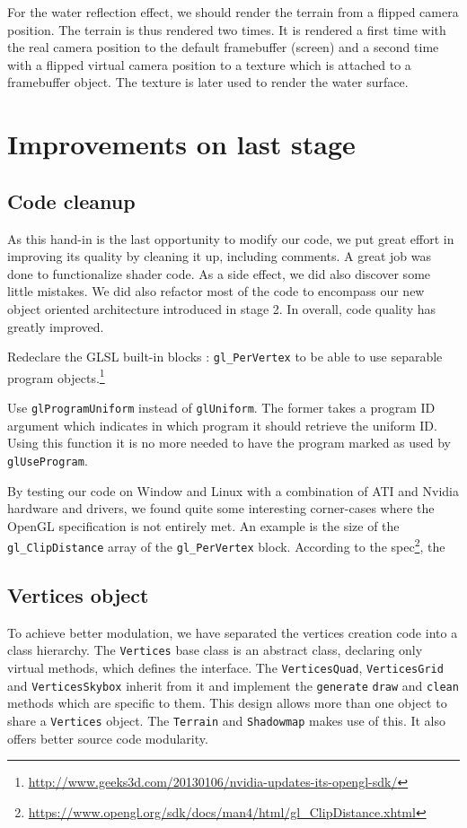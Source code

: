 \documentclass[a4paper,11pt]{article}
\begin{document}
For the water reflection effect, we should render the terrain from a flipped camera position. The terrain is thus rendered two times. It is rendered a first time with the real camera position to the default framebuffer (screen) and a second time with a flipped virtual camera position to a texture which is attached to a framebuffer object. The texture is later used to render the water surface.

\section{Improvements on last stage}

\subsection{Code cleanup}

As this hand-in is the last opportunity to modify our code, we put great effort in improving its quality by cleaning it up, including comments. A great job was done to functionalize shader code. As a side effect, we did also discover some little mistakes. We did also refactor most of the code to encompass our new object oriented architecture introduced in stage 2. In overall, code quality has greatly improved.

Redeclare the GLSL built-in blocks : \texttt{gl\_PerVertex} to be able to use separable program objects.\footnote{\url{http://www.geeks3d.com/20130106/nvidia-updates-its-opengl-sdk/}}

Use \texttt{glProgramUniform} instead of \texttt{glUniform}. The former takes a program ID argument which indicates in which program it should retrieve the uniform ID. Using this function it is no more needed to have the program marked as used by \texttt{glUseProgram}.

By testing our code on Window and Linux with a combination of ATI and Nvidia hardware and drivers, we found quite some interesting corner-cases where the OpenGL specification is not entirely met. An example is the size of the \texttt{gl\_ClipDistance} array of the \texttt{gl\_PerVertex} block. According to the spec\footnote{\url{https://www.opengl.org/sdk/docs/man4/html/gl\_ClipDistance.xhtml}}, the

\subsection{Vertices object}

To achieve better modulation, we have separated the vertices creation code into a class hierarchy. The \texttt{Vertices} base class is an abstract class, declaring only virtual methods, which defines the interface. The \texttt{VerticesQuad}, \texttt{VerticesGrid} and \texttt{VerticesSkybox} inherit from it and implement the \texttt{generate} \texttt{draw} and \texttt{clean} methods which are specific to them. This design allows more than one  object to share a \texttt{Vertices} object. The \texttt{Terrain} and \texttt{Shadowmap} makes use of this. It also offers better source code modularity.
\end{document}
